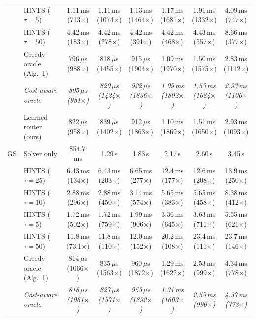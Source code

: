 {\begin{tabular}{llcccccc}
 & HINTS ($\tau{=}5$) & 1.11\,ms (713$\times$) & 1.11\,ms (1074$\times$) & 1.13\,ms (1464$\times$) & 1.17\,ms (1681$\times$) & 1.91\,ms (1332$\times$) & 4.09\,ms (747$\times$) \\
 & HINTS ($\tau{=}50$) & 4.42\,ms (183$\times$) & 4.42\,ms (278$\times$) & 4.42\,ms (391$\times$) & 4.42\,ms (468$\times$) & 4.43\,ms (557$\times$) & 8.66\,ms (377$\times$) \\
 & Greedy oracle (Alg.~1) & 796\,$\mu$s (988$\times$) & 818\,$\mu$s (1455$\times$) & 915\,$\mu$s (1904$\times$) & 1.09\,ms (1970$\times$) & 1.50\,ms (1575$\times$) & 2.83\,ms (1112$\times$) \\
 & \textit{Cost-aware oracle} & \textit{805\,$\mu$s (981$\times$)} & \textit{820\,$\mu$s (1424$\times$)} & \textit{922\,$\mu$s (1836$\times$)} & \textit{1.09\,ms (1892$\times$)} & \textit{1.53\,ms (1684$\times$)} & \textit{2.93\,ms (1106$\times$)} \\
 & Learned router (ours) & 822\,$\mu$s (958$\times$) & 839\,$\mu$s (1402$\times$) & 912\,$\mu$s (1863$\times$) & 1.10\,ms (1869$\times$) & 1.51\,ms (1650$\times$) & 2.93\,ms (1093$\times$) \\
\midrule
GS & Solver only & 854.7\,ms & 1.29\,s & 1.83\,s & 2.17\,s & 2.60\,s & 3.45\,s \\
 & HINTS ($\tau{=}25$) & 6.43\,ms (134$\times$) & 6.43\,ms (203$\times$) & 6.65\,ms (277$\times$) & 12.4\,ms (177$\times$) & 12.6\,ms (208$\times$) & 13.9\,ms (250$\times$) \\
 & HINTS ($\tau{=}10$) & 2.88\,ms (296$\times$) & 2.88\,ms (450$\times$) & 3.14\,ms (574$\times$) & 5.65\,ms (383$\times$) & 5.65\,ms (458$\times$) & 8.38\,ms (412$\times$) \\
 & HINTS ($\tau{=}5$) & 1.72\,ms (502$\times$) & 1.72\,ms (759$\times$) & 1.99\,ms (906$\times$) & 3.36\,ms (645$\times$) & 3.63\,ms (711$\times$) & 5.55\,ms (621$\times$) \\
 & HINTS ($\tau{=}50$) & 11.8\,ms (73.1$\times$) & 11.8\,ms (110$\times$) & 12.0\,ms (152$\times$) & 20.2\,ms (108$\times$) & 23.4\,ms (111$\times$) & 23.7\,ms (146$\times$) \\
 & Greedy oracle (Alg.~1) & 814\,$\mu$s (1066$\times$) & 835\,$\mu$s (1563$\times$) & 960\,$\mu$s (1872$\times$) & 1.29\,ms (1622$\times$) & 2.53\,ms (999$\times$) & 4.34\,ms (778$\times$) \\
 & \textit{Cost-aware oracle} & \textit{818\,$\mu$s (1061$\times$)} & \textit{827\,$\mu$s (1571$\times$)} & \textit{953\,$\mu$s (1892$\times$)} & \textit{1.31\,ms (1603$\times$)} & \textit{2.55\,ms (990$\times$)} & \textit{4.37\,ms (773$\times$)} \\

\end{tabular}}
